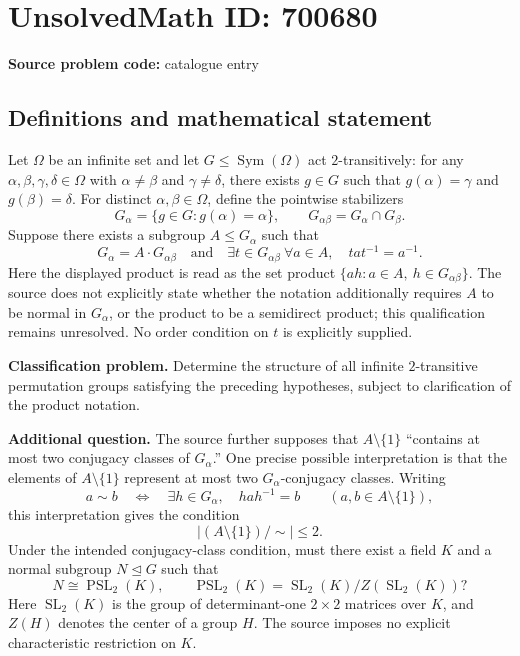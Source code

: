 \documentclass[11pt]{article}
\begin{document}
\section*{UnsolvedMath ID: 700680}
\textbf{Source problem code:} catalogue entry
\subsection{Definitions and mathematical statement}
Let \(\Omega\) be an infinite set and let \(G\leq\operatorname{Sym}(\Omega)\) act \(2\)-transitively: for any \(\alpha,\beta,\gamma,\delta\in\Omega\) with \(\alpha\ne\beta\) and \(\gamma\ne\delta\), there exists \(g\in G\) such that \(g(\alpha)=\gamma\) and \(g(\beta)=\delta\). For distinct \(\alpha,\beta\in\Omega\), define the pointwise stabilizers
\[
G_\alpha=\{g\in G:g(\alpha)=\alpha\},\qquad
G_{\alpha\beta}=G_\alpha\cap G_\beta.
\]
Suppose there exists a subgroup \(A\leq G_\alpha\) such that
\[
G_\alpha=A\cdot G_{\alpha\beta}
\quad\text{and}\quad
\exists t\in G_{\alpha\beta}\ \forall a\in A,\quad tat^{-1}=a^{-1}.
\]
Here the displayed product is read as the set product \(\{ah:a\in A,\ h\in G_{\alpha\beta}\}\). The source does not explicitly state whether the notation additionally requires \(A\) to be normal in \(G_\alpha\), or the product to be a semidirect product; this qualification remains unresolved. No order condition on \(t\) is explicitly supplied.

\textbf{Classification problem.} Determine the structure of all infinite \(2\)-transitive permutation groups satisfying the preceding hypotheses, subject to clarification of the product notation.

\textbf{Additional question.} The source further supposes that \(A\setminus\{1\}\) ``contains at most two conjugacy classes of \(G_\alpha\).'' One precise possible interpretation is that the elements of \(A\setminus\{1\}\) represent at most two \(G_\alpha\)-conjugacy classes. Writing
\[
a\sim b\quad\Longleftrightarrow\quad
\exists h\in G_\alpha,\quad hah^{-1}=b
\qquad(a,b\in A\setminus\{1\}),
\]
this interpretation gives the condition
\[
\bigl|(A\setminus\{1\})/{\sim}\bigr|\leq 2.
\]
Under the intended conjugacy-class condition, must there exist a field \(K\) and a normal subgroup \(N\trianglelefteq G\) such that
\[
N\cong\operatorname{PSL}_2(K),\qquad
\operatorname{PSL}_2(K)=\operatorname{SL}_2(K)/Z(\operatorname{SL}_2(K))?
\]
Here \(\operatorname{SL}_2(K)\) is the group of determinant-one \(2\times2\) matrices over \(K\), and \(Z(H)\) denotes the center of a group \(H\). The source imposes no explicit characteristic restriction on \(K\).
\end{document}
